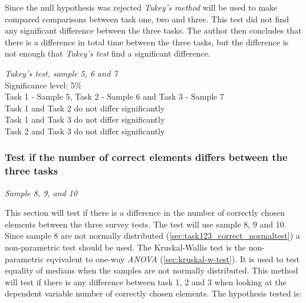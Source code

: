 Since the null hypothesis was rejected \textit{Tukey's method} will be used to make compared comparisons between task one, two and three. This test did not find any significant difference between the three tasks. The author then concludes that there is a difference in total time between the three tasks, but the difference is not enough that \textit{Tukey's test} find a significant difference. 

 \begin{center}
	\begin{tcolorbox}[width=0.8\textwidth]
		\centering
		\textit{Tukey's test, sample 5, 6 and 7}\\
		Significance level: 5\%  \\[0.5cm]
		Task 1 - Sample 5, Task 2 - Sample 6 and Task 3 - Sample 7 \\[0.5cm]
		
		Task 1 and Task 2 do not differ significantly \\
		Task 1 and Task 3 do not differ significantly \\
		Task 2 and Task 3 do not differ significantly \\[0.2cm]
	\end{tcolorbox} 
\end{center}

\vspace{0.5cm}

\subsubsection[Sample 8, 9, and 10]{Test if the number of correct elements differs between the three tasks}\label{sec:sample_8_9_10_kruskal)} %
\textit{Sample 8, 9, and 10}\newline

This section will test if there is a difference in the number of correctly chosen elements between the three survey tests. The test will use sample 8, 9 and 10. Since sample 8 are not normally distributed (\ref{sec:task123_correct_normaltest}) a non-parametric test should be used. The Kruskal-Wallis test is the non-parametric eqvivalent to one-way \textit{ANOVA} (\ref{sec:kruskal-w-test}). It is used to test equality of medians when the samples are not normally distributed. This method will test if there is any difference between task 1, 2 and 3 when looking at the dependent variable number of correctly chosen elements. The hypothesis tested is: \\[0.2cm]

